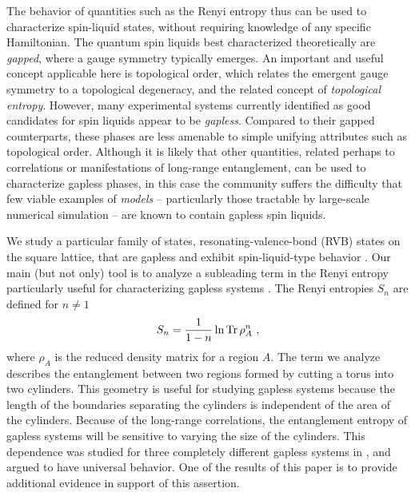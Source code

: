 \documentclass[11pt]{iopart}
\begin{document}
The behavior of quantities such as the Renyi entropy thus can be used to characterize spin-liquid states, without requiring knowledge of any specific Hamiltonian. The quantum spin liquids best characterized theoretically are {\it gapped}, where a gauge symmetry typically emerges.
An important and useful concept applicable here is topological order, which relates the emergent gauge symmetry to a topological degeneracy, and the related concept of {\it topological entropy}\cite{HIZ,KP,LW}. 
However, many experimental systems currently identified as good candidates for spin liquids appear to be {\it gapless}.  Compared to their gapped counterparts, these phases are less amenable to simple unifying attributes such as topological order.  Although it is likely that other quantities, related perhaps to correlations or manifestations of long-range entanglement, can be used to characterize gapless phases, in this case the community suffers the difficulty that few viable examples of {\it models} -- particularly those tractable by large-scale numerical simulation -- are known to contain gapless spin liquids.

We study a particular family of states, resonating-valence-bond (RVB) states on the square lattice, that are gapless and exhibit spin-liquid-type behavior \cite{RokhsarKivelson,RVB1,RVB2}. Our main (but not only) tool is to analyze a subleading term in the Renyi entropy particularly useful for characterizing gapless systems \cite{Ju2012}. The Renyi entropies $S_n$ are defined for $n\neq 1$
\begin{equation}
S_n=\frac{1}{1-n} \ln {\rm Tr}\, \rho_A^n\ , \label{RenyiEq}
\end{equation}
where $\rho_A$ is the reduced density matrix for a region $A$. The term we analyze describes 
the entanglement between two regions formed by cutting a torus into two cylinders. This geometry is useful for studying gapless systems because the length of the boundaries separating the cylinders is independent of the area of the cylinders. Because of the long-range correlations, the entanglement entropy of gapless systems will be sensitive to varying the size of the cylinders. This dependence was studied for three completely different gapless systems in \cite{Ju2012}, and argued to have universal behavior. One of the results of this paper is to provide additional evidence in support of this assertion.
\end{document}
